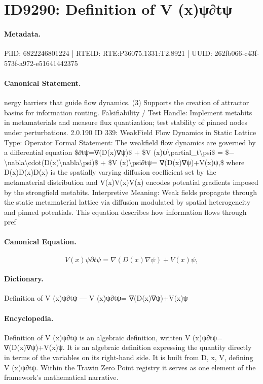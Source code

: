 \section*{ID9290: Definition of V (x)ψ∂tψ}
\paragraph{Metadata.}
PiID: 6822246801224 | RTEID: RTE:P36075.1331:T2.8921 | UUID: 262fb066-c43f-573f-a972-e51641442375

\paragraph{Canonical Statement.}
nergy barriers that guide flow dynamics. (3) Supports the creation of attractor basins for information routing. Falsifiability / Test Handle: Implement metabits in metamaterials and measure flux quantization; test stability of pinned nodes under perturbations. 2.0.190 ID 339: WeakField Flow Dynamics in Static Lattice Type: Operator Formal Statement: The weakfield flow dynamics are governed by a differential equation \$∂tψ=∇(D(x)∇ψ)\$ + \$V (x)ψ\textbackslash{}partial\_t\textbackslash{}psi\$ = \$−\textbackslash{}nabla\textbackslash{}cdot(D(x)\textbackslash{}nabla\textbackslash{}psi)\$ + \$V (x)\textbackslash{}psi∂tψ= ∇(D(x)∇ψ)+V(x)ψ,\$ where D(x)D(x)D(x) is the spatially varying diffusion coefficient set by the metamaterial distribution and V(x)V(x)V(x) encodes potential gradients imposed by the strongfield metabits. Interpretive Meaning: Weak fields propagate through the static metamaterial lattice via diffusion modulated by spatial heterogeneity and pinned potentials. This equation describes how information flows through pref

\paragraph{Canonical Equation.}
\[
V (x)\psi∂tψ= ∇(D(x)∇ψ)+V(x)ψ,
\]

\paragraph{Dictionary.}
Definition of V (x)ψ∂tψ — V (x)ψ∂tψ= ∇(D(x)∇ψ)+V(x)ψ

\paragraph{Encyclopedia.}
Definition of V (x)ψ∂tψ is an algebraic definition, written V (x)ψ∂tψ= ∇(D(x)∇ψ)+V(x)ψ. It is an algebraic definition expressing the quantity directly in terms of the variables on its right-hand side. It is built from D, x, V, defining V (x)ψ∂tψ. Within the Trawin Zero Point registry it serves as one element of the framework's mathematical narrative.
